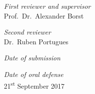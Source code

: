 \hfill

\vfill

\textit{First reviewer and supervisor} \\
Prof.\ Dr.\ Alexander Borst

\bigskip

\textit{Second reviewer} \\
Dr.\ Ruben Portugues

\bigskip

\textit{Date of submission} \\
\myTime

\bigskip

\textit{Date of oral defense} \\
21\textsuperscript{st} September 2017